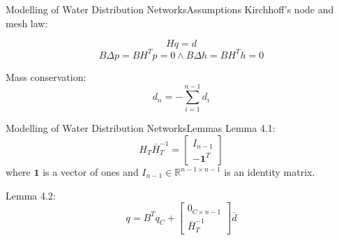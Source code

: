 \begin{frame}{Modelling of Water Distribution Networks}{Assumptions}
	Kirchhoff's node and mesh law:
	
	\begin{equation}
		Hq = d  
	\end{equation} 
	\begin{equation}
		B\Delta p = B H^T p = 0 \wedge B\Delta h = B H^T h = 0 
	\end{equation} 

	Mass conservation:
	\begin{equation}\label{eq:MassConservation}
		d_n = -\sum_{i=1}^{n-1}d_i
	\end{equation}
\end{frame}


\begin{frame}{Modelling of Water Distribution Networks}{Lemmas}
	Lemma 4.1:
	\begin{equation}\label{eq:TreePartitionLemma}
		H_T\bar{H}_T^{-1} = \begin{bmatrix} I_{n-1} \\ -\mathbf{1}^T	\end{bmatrix}
	\end{equation}
	where $\mathbf{1}$ is a vector of ones and $I_{n-1} \in \mathbb{R}^{n-1 \times n-1}$ is an identity matrix.


	Lemma 4.2:
	\begin{equation}\label{eq:EdgeFlowDecomposition}
		q = B^T q_C +
		\begin{bmatrix}
			0_{C \times n-1} \\ \bar{H}_T^{-1} 
		\end{bmatrix}
		\bar{d}
	\end{equation}

\end{frame}


